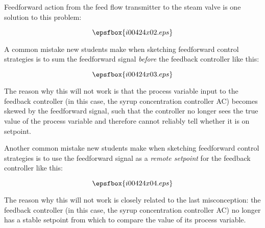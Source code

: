 





Feedforward action from the feed flow transmitter to the steam valve is one solution to this problem:

$$\epsfbox{i00424x02.eps}$$







A common mistake new students make when sketching feedforward control strategies is to sum the feedforward signal {\it before} the feedback controller like this:

$$\epsfbox{i00424x03.eps}$$

The reason why this will not work is that the process variable input to the feedback controller (in this case, the syrup concentration controller AC) becomes skewed by the feedforward signal, such that the controller no longer sees the true value of the process variable and therefore cannot reliably tell whether it is on setpoint.

\filbreak

Another common mistake new students make when sketching feedforward control strategies is to use the feedforward signal as a {\it remote setpoint} for the feedback controller like this:

$$\epsfbox{i00424x04.eps}$$

The reason why this will not work is closely related to the last misconception: the feedback controller (in this case, the syrup concentration controller AC) no longer has a stable setpoint from which to compare the value of its process variable.




